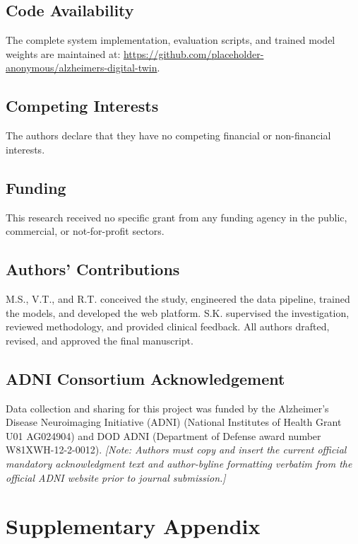 \documentclass[11pt,a4paper]{article}
\begin{document}
\subsection*{Code Availability}
The complete system implementation, evaluation scripts, and trained model weights are maintained at: \url{https://github.com/placeholder-anonymous/alzheimers-digital-twin}.

\subsection*{Competing Interests}
The authors declare that they have no competing financial or non-financial interests.

\subsection*{Funding}
This research received no specific grant from any funding agency in the public, commercial, or not-for-profit sectors.

\subsection*{Authors' Contributions}
M.S., V.T., and R.T. conceived the study, engineered the data pipeline, trained the models, and developed the web platform. S.K. supervised the investigation, reviewed methodology, and provided clinical feedback. All authors drafted, revised, and approved the final manuscript.

\subsection*{ADNI Consortium Acknowledgement}
Data collection and sharing for this project was funded by the Alzheimer's Disease Neuroimaging Initiative (ADNI) (National Institutes of Health Grant U01 AG024904) and DOD ADNI (Department of Defense award number W81XWH-12-2-0012). \textit{[Note: Authors must copy and insert the current official mandatory acknowledgment text and author-byline formatting verbatim from the official ADNI website prior to journal submission.]}




\newpage
\appendix
\section*{Supplementary Appendix}
\end{document}
